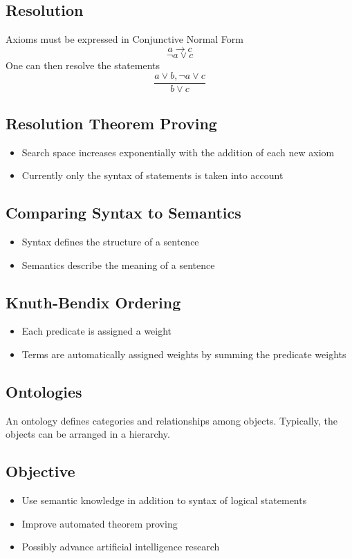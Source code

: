 \documentclass{article}
\begin{document}
	\subsection{Resolution}
		Axioms must be expressed in Conjunctive Normal Form
		\[a \rightarrow c\]
		\[\lnot a \lor c\]
		One can then resolve the statements
		\[\frac{a \lor b, \lnot a \lor c }{b \lor c}\]
	
	\subsection{Resolution Theorem Proving}
        \begin{itemize}
            \item Search space increases exponentially with the addition of each new axiom
            \item Currently only the syntax of statements is taken into account
        \end{itemize}
	
	\subsection{Comparing Syntax to Semantics}
		\begin{itemize}
		    \item Syntax defines the structure of a sentence
		    \item Semantics describe the meaning of a sentence
		\end{itemize}
	
	\subsection{Knuth-Bendix Ordering}
		\begin{itemize}
		    \item Each predicate is assigned a weight
		    \item Terms are automatically assigned weights by summing the predicate weights
		\end{itemize}
	
	\subsection{Ontologies}
		An ontology defines categories and relationships among objects. Typically, the objects can be arranged in a hierarchy. 

	
	\subsection{Objective}
		\begin{itemize}
		    \item Use semantic knowledge in addition to syntax of logical statements
		    \item Improve automated theorem proving
		    \item Possibly advance artificial intelligence research
		\end{itemize}
	



\printbibliography
\end{document}
